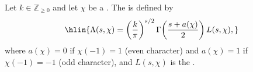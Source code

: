 \begin{definition} \label{definition:completed_dirichlet_L_function_of_a_dirichlet_character_modulo_k}
Let $k \in \mathbb{Z}_{\geq 0}$ and let $\chi$ be a . The  is defined by
$$\hlin{ \Lambda(s, \chi) = \left( \frac{k}{\pi} \right)^{s/2} \Gamma\!\left( \frac{s + a(\chi)}{2} \right) L(s, \chi), }$$
where $a(\chi) = 0$ if $\chi(-1) = 1$ (even character) and $a(\chi) = 1$ if $\chi(-1) = -1$ (odd character), and $L(s,\chi)$ is the .
\end{definition}